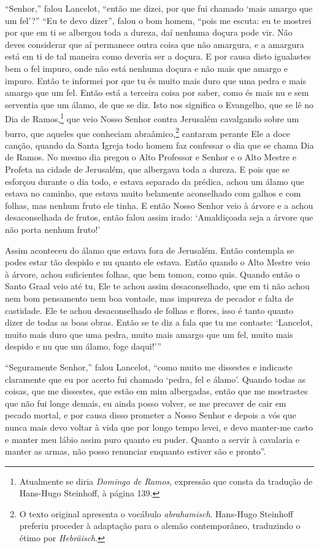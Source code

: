 “Senhor,” falou Lancelot, “então me dizei, por que fui chamado ‘mais amargo que
um fel’?” “Eu te devo dizer”, falou o bom homem, “pois me escuta: eu te
mostrei por que em ti se albergou toda a dureza, daí nenhuma doçura pode vir.
Não deves considerar que aí permanece outra coisa que não amargura, e a
amargura está em ti de tal maneira como deveria ser a doçura. E por causa disto
igualastes bem o fel impuro, onde não está nenhuma doçura e não mais que amargo
e impuro. Então te informei por que tu és muito mais duro que uma pedra e mais
amargo que um fel. Então está a terceira coisa por saber, como és mais nu e sem
serventia que um álamo, de que se diz. Isto nos significa o Evangelho, que se
lê no Dia de Ramos,\footnote{ Atualmente se diria \textit{Domingo de Ramos},
expressão que consta da tradução de Hans-Hugo Steinhoff, à página 139. 
 } que veio Nosso Senhor contra Jerusalém cavalgando sobre um burro, que
aqueles que conheciam abraâmico,\footnote{ O texto original apresenta o vocábulo
\textit{abrahamisch}. Hans-Hugo Steinhoff preferiu proceder à
adaptação para o alemão contemporâneo, traduzindo o étimo por
\textit{Hebräisch}.} cantaram perante Ele a doce
canção, quando da Santa Igreja todo homem faz confessar o dia que se chama Dia
de Ramos. No mesmo dia pregou o Alto Professor e Senhor e o Alto Mestre e
Profeta na cidade de Jerusalém, que albergava toda a dureza. E pois que se
esforçou durante o dia todo, e estava separado da prédica, achou um álamo que
estava no caminho, que estava muito belamente aconselhado com galhos e com
folhas, mas nenhum fruto ele tinha. E então Nosso Senhor veio à árvore e a
achou desaconselhada de frutos, então falou assim irado: ‘Amaldiçoada seja a
árvore que não porta nenhum fruto!’ 

Assim aconteceu do álamo que estava fora de Jerusalém. Então contempla se podes
estar tão despido e nu quanto ele estava. Então quando o Alto Mestre veio à
árvore, achou suficientes folhas, que bem tomou, como quis. Quando então o
Santo Graal veio até tu, Ele te achou assim desaconselhado, que em ti não achou
nem bom pensamento nem boa vontade, mas impureza de pecador e falta de
castidade. Ele te achou desaconselhado de folhas e flores, isso é tanto quanto
dizer de todas as boas obras. Então se te diz a fala que tu me contaste:
‘Lancelot, muito mais duro que uma pedra, muito mais amargo que um fel, muito
mais despido e nu que um álamo, foge daqui!'” 

``Seguramente Senhor,” falou Lancelot, “como muito me dissestes e indicaste
claramente que eu por acerto fui chamado ‘pedra, fel e álamo’. Quando todas as
coisas, que me dissestes, que estão em mim albergadas, então que me mostrastes
que não fui longe demais, eu ainda posso volver, se me precaver de cair em
pecado mortal, e por causa disso prometer a Nosso Senhor e depois a vós que
nunca mais devo voltar à vida que por longo tempo levei, e devo manter-me casto
e  manter meu lábio assim puro quanto eu puder. Quanto a servir à cavalaria
e manter as armas, não posso renunciar enquanto estiver são e pronto”.

